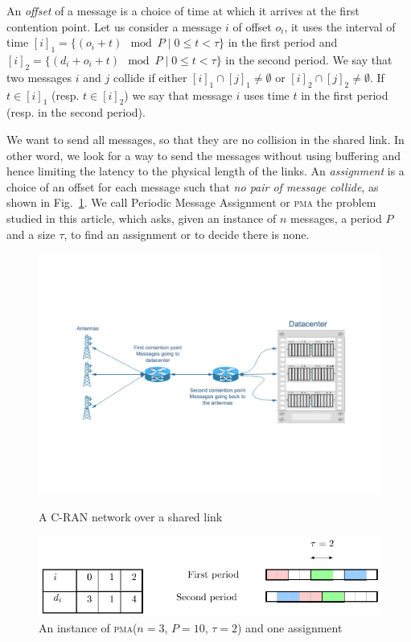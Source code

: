 \documentclass[10pt, conference, letterpaper]{algotel}
\newcommand\pma{\textsc{pma}\xspace}
\begin{document}
An \emph{offset} of a message is a choice of time at which it arrives
at the first contention point. Let us consider a message $i$
of offset $o_i$, it uses the interval of time $[i]_1 = \{ (o_i + t) \mod P \mid 0 \leq t < \tau \}$ in the first period and $[i]_2 = \{ (d_i + o_i + t) \mod P \mid 0 \leq t < \tau \}$ in the second period. We say that two messages $i$ and $j$ collide if either $[i]_1 \cap [j]_1 \neq \emptyset $ or $[i]_2 \cap [j]_2 \neq \emptyset $. If $t \in [i]_1$ (resp. $t \in [i]_2$) we say that message $i$ uses time $t$ in the first period (resp. in the second period).

We want to send all messages, so that they are no collision in the shared link.
In other word, we look for a way to send the messages without using buffering and 
hence limiting the latency to the physical length of the links. An \emph{assignment} is a
choice of an offset for each message such that \emph{no pair of message collide}, as shown in Fig.~\ref{fig:assignment}.  
We call Periodic Message Assignment or \pma the problem studied in this article,
which asks, given an instance of $n$ messages, a period $P$ and a size $\tau$, to find 
an assignment or to decide there is none.
\begin{figure}
\begin{minipage}[c]{.45\linewidth}


\includegraphics[scale=0.25]{network}
\caption{A C-RAN network over a shared link}
\label{fig:network}
\end{minipage}
\begin{minipage}[c]{.5\linewidth}



\begin{center}
\includegraphics[scale=0.5]{instance}
\end{center}
\caption{An instance of \pma ($n=3$, $P= 10$, $\tau = 2$) and one assignment}
\label{fig:assignment}

\end{minipage}
\end{figure}
\end{document}
